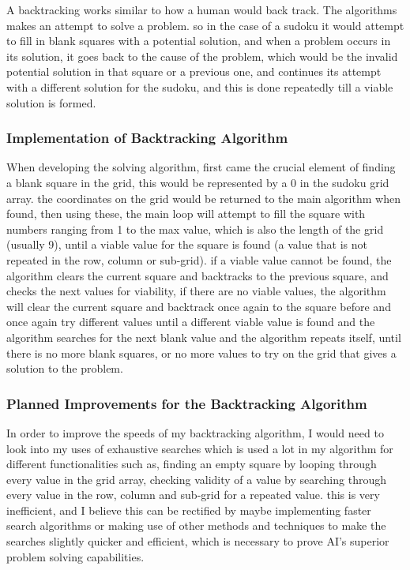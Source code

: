 \documentclass[]{final_report}
\begin{document}
A backtracking works similar to how a human would back track. The algorithms makes an attempt to solve a problem. so in the case of a sudoku it would attempt to fill in blank squares with a potential solution, and when a problem occurs in its solution, it goes back to the cause of the problem, which would be the invalid potential solution in that square or a previous one, and continues its attempt with a different solution for the sudoku, and this is done repeatedly till a viable solution is formed.  

\subsubsection{Implementation of Backtracking Algorithm} 

When developing the solving algorithm, first came the crucial element of finding a blank square in the grid, this would be represented by a 0 in the sudoku grid array. the coordinates on the grid would be returned to the main algorithm when found, then using these, the main loop will attempt to fill the square with numbers ranging from 1 to the max value, which is also the length of the grid (usually 9), until a viable value for the square is found (a value that is not repeated in the row, column or sub-grid). if a viable value cannot be found, the algorithm clears the current square and backtracks to the previous square, and checks the next values for viability, if there are no viable values, the algorithm will clear the current square and backtrack once again to the square before and once again try different values until a different viable value is found and the algorithm searches for the next blank value and the algorithm repeats itself, until there is no more blank squares, or no more values to try on the grid that gives a solution to the problem. 

\subsubsection{Planned Improvements for the Backtracking Algorithm} 

In order to improve the speeds of my backtracking algorithm, I would need to look into my uses of exhaustive searches which is used a lot in my algorithm for different functionalities such as, finding an empty square by looping through every value in the grid array, checking validity of a value by searching through every value in the row, column and sub-grid for a repeated value. this is very inefficient, and I believe this can be rectified by maybe implementing faster search algorithms or making use of other methods and techniques to make the searches slightly quicker and efficient, which is necessary to prove AI's superior problem solving capabilities. 
\end{document}

